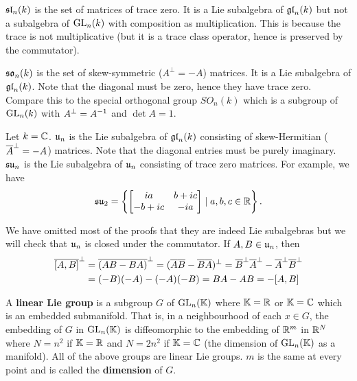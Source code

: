 \begin{exam}
  $\operatorname{\mathfrak{sl}}_n(k)$ is the set of matrices of trace zero.
  It is a Lie subalgebra of $\operatorname{\mathfrak{gl}}_n(k)$ but not a subalgebra of $\operatorname{GL}_n(k)$ with composition as multiplication.
  This is because the trace is not multiplicative (but it is a trace class operator, hence is preserved by the commutator).
\end{exam}

\begin{exam}
  \lv
  \begin{enum}
    \io
    $\mathfrak{so}_n(k)$ is the set of skew-symmetric ($A^\perp=-A$) matrices.
    It is a Lie subalgebra of $\operatorname{\mathfrak{gl}}_n(k)$.
    Note that the diagonal must be zero, hence they have trace zero.
    Compare this to the special orthogonal group $SO_n(k)$ which is a subgroup of $\operatorname{GL}_n(k)$ with $A^\perp=A^{-1}$ and $\det A=1$.

    \io
    Let $k=\mathbb{C}$.
    $\mathfrak{u}_n$ is the Lie subalgebra of $\operatorname{\mathfrak{gl}}_n(k)$ consisting of skew-Hermitian ($\overline A^\perp=-A$) matrices.
    Note that the diagonal entries must be purely imaginary.
    $\mathfrak{su}_n$ is the Lie subalgebra of $\mathfrak{u}_n$ consisting of trace zero matrices.
    For example, we have
    \[ \mathfrak{su}_2 = \left\{ 
	\begin{bmatrix}
	  ia & b+ic \\ -b+ic & -ia
	\end{bmatrix}
	\mid a,b,c \in \mathbb{R}
    \right\}. \]
  \end{enum}

  We have omitted most of the proofs that they are indeed Lie subalgebras but we will check that $\mathfrak{u}_n$ is closed under the commutator.
  If $A,B \in \mathfrak{u}_n$, then
  \begin{align*}
    \overline{[A,B]}^\perp &= \overline{(AB-BA)}^\perp = (\overline A \overline B - \overline B \overline A)^\perp = \overline B^\perp \overline A^\perp - \overline A^\perp \overline B^\perp \\
    &= (-B)(-A)-(-A)(-B) = BA-AB = -[A,B]
  \end{align*}
\end{exam}

\begin{defn}
  A \textbf{linear Lie group} is a subgroup $G$ of $\operatorname{GL}_n(\mathbb{K})$ where $\mathbb{K}=\mathbb{R}$ or $\mathbb{K}=\mathbb{C}$ which is an embedded submanifold.
  That is, in a neighbourhood of each $x \in G$, the embedding of $G$ in $\operatorname{GL}_n(\mathbb{K})$ is diffeomorphic to the embedding of $\mathbb{R}^m$ in $\mathbb{R}^N$ where $N=n^2$ if $\mathbb{K}=\mathbb{R}$ and $N=2n^2$ if $\mathbb{K}=\mathbb{C}$ (the dimension of $\operatorname{GL}_n(\mathbb{K})$ as a manifold).
  All of the above groups are linear Lie groups.
  $m$ is the same at every point and is called the \textbf{dimension} of $G$.
\end{defn}

